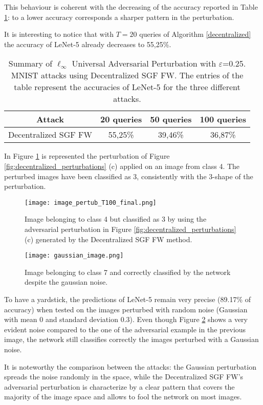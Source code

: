 This behaviour is coherent with the decreasing of the accuracy reported in Table \ref{tab:decentralized}: to a lower accuracy corresponds a sharper pattern in the perturbation.

It is interesting to notice that with $T=20$ queries of Algorithm \ref{decentralized} the accuracy of LeNet-5 already decreases to 55,25\%.
\begin{table}[htbp]
	\begin{center}
		\begin{adjustwidth}{-.6cm}{}
			\begin{tabular}{c|ccc}
				\textbf{Attack} &          20 \textbf{queries} &      50 \textbf{queries} &     100 \textbf{queries} \\
				\midrule
				{\small Decentralized SGF FW}     &    55,25\% &    39,46\% &       36,87\% \\
			\end{tabular}
		\end{adjustwidth}
	\end{center}
	\caption{{\small  Summary of $\ell_\infty$ Universal Adversarial Perturbation with $\varepsilon$=0.25. MNIST attacks using Decentralized SGF FW. The entries of the table represent the accuracies of LeNet-5 for the three different attacks.}}
	\label{tab:decentralized}
\end{table}

In Figure \ref{fig:decentralized} is represented the perturbation of Figure \ref{fig:decentralized_perturbations} (c)
applied on an image from class 4. The perturbed images have been classified as 3, consistently with the 3-shape of the perturbation.
\begin{figure}[htbp]
	\centering
	\texttt{[image: image\_pertub\_T100\_final.png]}
	\caption{{\small Image belonging to class 4 but classified as 3 by using the adversarial perturbation in Figure \ref{fig:decentralized_perturbations} (c) generated by the Decentralized SGF FW method.}}
	\label{fig:decentralized}
\end{figure}
\begin{figure}[htbp]
	\centering
	\texttt{[image: gaussian\_image.png]}
	\caption{{\small Image belonging to class 7 and correctly classified by the network despite the gaussian noise.}}
	\label{fig:gaussian_noise}
\end{figure}
To have a yardstick, the predictions of LeNet-5 remain very precise (89.17\% of accuracy) when tested on the images perturbed with random noise (Gaussian with mean 0 and standard deviation 0.3). Even though Figure \ref{fig:gaussian_noise} shows a very evident noise compared to the one of the adversarial example in the previous image, the network still classifies correctly the images perturbed with a Gaussian noise.

It is noteworthy the comparison between the attacks: the Gaussian perturbation spreads the noise randomly in the space, while the Decentralized SGF FW's adversarial perturbation is characterize by a clear pattern that covers the majority of the image space and allows to fool the network on most images.